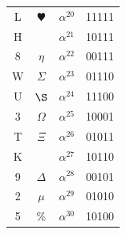 \documentclass[letterpaper]{article}
\begin{document}
\begin{minipage}[b]{0.3\linewidth}
\begin{center}
\begin{tabular}{|cccc|}
L & $\varheartsuit$ & $\alpha^{20}$ & 11111 \\
H & \EUR{}       & $\alpha^{21}$ & 10111 \\
8 & $\eta$     & $\alpha^{22}$ & 00111 \\
W & $\Sigma$   & $\alpha^{23}$ & 01110 \\
U & $\S$       & $\alpha^{24}$ & 11100 \\
3 & $\Omega$   & $\alpha^{25}$ & 10001 \\
T & $\Xi$      & $\alpha^{26}$ & 01011 \\
K & \yen{}       & $\alpha^{27}$ & 10110 \\
9 & $\Delta$   & $\alpha^{28}$ & 00101 \\
2 & $\mu$      & $\alpha^{29}$ & 01010 \\
5 & \%         & $\alpha^{30}$ & 10100 \\
\hline
\end{tabular}
\end{center}
\end{minipage}
\end{document}
